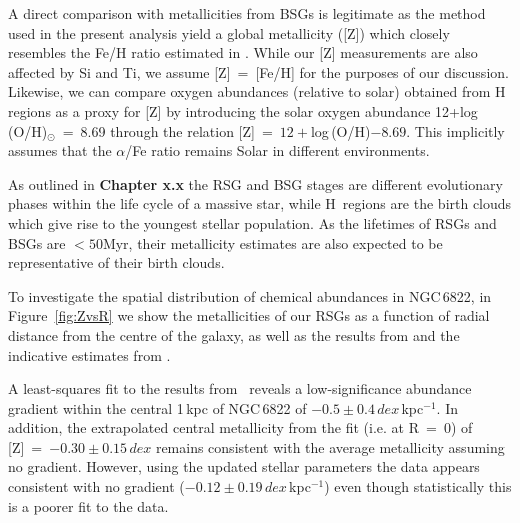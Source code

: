 A direct comparison with metallicities from BSGs is legitimate as the method used in the present analysis yield a global metallicity ([Z]) which
closely resembles the Fe/H ratio estimated in
\cite{2001ApJ...547..765V}.
While our [Z] measurements are also affected by Si and Ti,
we assume [Z]~=~[Fe/H] for the purposes of our discussion.
Likewise, we can compare oxygen abundances (relative to solar) obtained from H\,\2 regions as a proxy for [Z] by
introducing the solar oxygen abundance
{12+log\,(O/H)}$_{\odot}$~=~8.69
\citep{2009ARA&A..47..481A} through the relation
[Z]~=~$12 + $log\,(O/H)$ - 8.69$.
This implicitly assumes that the $\alpha$/Fe ratio remains Solar in different environments.

As outlined in \textbf{Chapter x.x} the RSG and BSG stages are different evolutionary phases within the life cycle of a massive star,
while H\,\2 regions are the birth clouds which give rise to the youngest stellar population.
As the lifetimes of RSGs and BSGs are $<50$Myr,
their metallicity estimates are also expected to be representative of their birth clouds.

To investigate the spatial distribution of chemical abundances in NGC\,6822,
in Figure~\ref{fig:ZvsR}
we show the metallicities of our RSGs as a function of radial distance from the centre of the galaxy,
as well as the results from
\cite{2001ApJ...547..765V} and the indicative estimates from
\cite{1999A&A...352L..40M}.


A least-squares fit to the results from~\cite{2015ApJ...803...14P} reveals a low-significance abundance gradient within the central 1\,kpc of NGC\,6822 of $-0.5\pm0.4\,dex\,$kpc$^{-1}$.
In addition, the extrapolated central metallicity from the fit (i.e. at R~=~0) of [Z]~=~$-0.30\pm0.15\,dex$ remains consistent with the average metallicity assuming no gradient.
However, using the updated stellar parameters the data appears consistent with no gradient ($-0.12\pm0.19\,dex\,$kpc$^{-1}$) even though statistically this is a poorer fit to the data.



